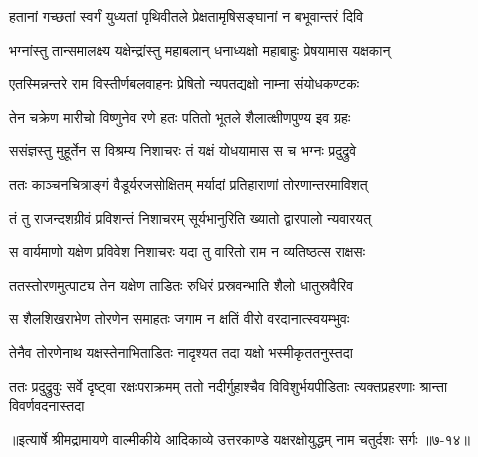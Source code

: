 \twolineshloka
{हतानां गच्छतां स्वर्गं युध्यतां पृथिवीतले}
{प्रेक्षतामृषिसङ्घानां न बभूवान्तरं दिवि} %

\twolineshloka
{भग्नांस्तु तान्समालक्ष्य यक्षेन्द्रांस्तु महाबलान्}
{धनाध्यक्षो महाबाहुः प्रेषयामास यक्षकान्} %

\twolineshloka
{एतस्मिन्नन्तरे राम विस्तीर्णबलवाहनः}
{प्रेषितो न्यपतद्यक्षो नाम्ना संयोधकण्टकः} %

\twolineshloka
{तेन चक्रेण मारीचो विष्णुनेव रणे हतः}
{पतितो भूतले शैलात्क्षीणपुण्य इव ग्रहः} %

\twolineshloka
{ससंज्ञस्तु मुहूर्तेन स विश्रम्य निशाचरः}
{तं यक्षं योधयामास स च भग्नः प्रदुद्रुवे} %

\twolineshloka
{ततः काञ्चनचित्राङ्गं वैडूर्यरजसोक्षितम्}
{मर्यादां प्रतिहाराणां तोरणान्तरमाविशत्} %

\twolineshloka
{तं तु राजन्दशग्रीवं प्रविशन्तं निशाचरम्}
{सूर्यभानुरिति ख्यातो द्वारपालो न्यवारयत्} %

\twolineshloka
{स वार्यमाणो यक्षेण प्रविवेश निशाचरः}
{यदा तु वारितो राम न व्यतिष्ठत्स राक्षसः} %

\twolineshloka
{ततस्तोरणमुत्पाट्य तेन यक्षेण ताडितः}
{रुधिरं प्रस्रवन्भाति शैलो धातुस्रवैरिव} %

\twolineshloka
{स शैलशिखराभेण तोरणेन समाहतः}
{जगाम न क्षतिं वीरो वरदानात्स्वयम्भुवः} %

\twolineshloka
{तेनैव तोरणेनाथ यक्षस्तेनाभिताडितः}
{नादृश्यत तदा यक्षो भस्मीकृततनुस्तदा} %

\threelineshloka
{ततः प्रदुद्रुवुः सर्वे दृष्ट्वा रक्षःपराक्रमम्}
{ततो नदीर्गुहाश्चैव विविशुर्भयपीडिताः}
{त्यक्तप्रहरणाः श्रान्ता विवर्णवदनास्तदा} %


॥इत्यार्षे श्रीमद्रामायणे वाल्मीकीये आदिकाव्ये उत्तरकाण्डे यक्षरक्षोयुद्धम् नाम चतुर्दशः सर्गः ॥७-१४॥
